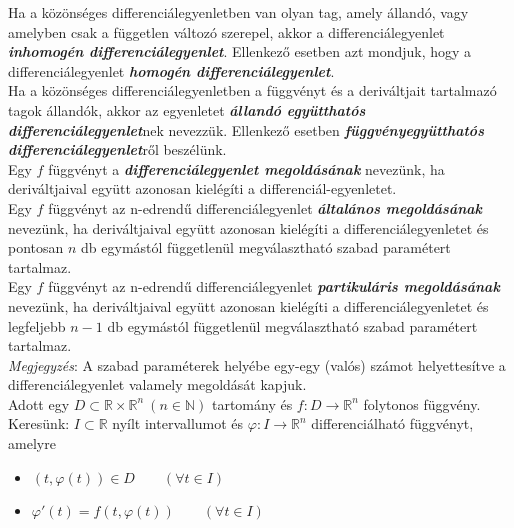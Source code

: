 \documentclass[12pt,margin=0px]{article}
\begin{document}
    \noindent Ha a közönséges differenciálegyenletben van olyan tag, amely állandó, vagy amelyben csak a független változó szerepel, akkor a differenciálegyenlet \textbf{\emph{inhomogén differenciálegyenlet}}. Ellenkező esetben azt mondjuk, hogy a differenciálegyenlet \textbf{\emph{homogén differenciálegyenlet}}.\\

    \noindent Ha a közönséges differenciálegyenletben a függvényt és a deriváltjait tartalmazó tagok állandók, akkor az egyenletet \textbf{\emph{állandó együtthatós differenciálegyenlet}}nek nevezzük.  Ellenkező esetben \textbf{\emph{függvényegyütthatós differenciálegyenlet}}ről beszélünk.\\

    \noindent Egy $f$ függvényt a \textbf{\emph{differenciálegyenlet megoldásának}} nevezünk, ha deriváltjaival együtt azonosan kielégíti a differenciál-egyenletet.\\

    \noindent Egy $f$ függvényt  az n-edrendű  differenciálegyenlet \textbf{\emph{általános megoldásának}} nevezünk, ha deriváltjaival együtt azonosan kielégíti a differenciálegyenletet és pontosan $n$ db egymástól függetlenül megválasztható szabad paramétert tartalmaz.\\

    \noindent Egy $f$ függvényt az n-edrendű differenciálegyenlet \textbf{\emph{partikuláris megoldásának}} nevezünk, ha deriváltjaival együtt azonosan kielégíti a differenciálegyenletet és legfeljebb $n-1$ db egymástól függetlenül megválasztható szabad paramétert tartalmaz.\\

    \noindent \emph{Megjegyzés}: A szabad paraméterek helyébe egy-egy (valós) számot helyettesítve a differenciálegyenlet valamely megoldását kapjuk.\\

    \noindent Adott egy $D \subset \mathbb{R} \times \mathbb{R}^{n}\ (n \in \mathbb{N})$ tartomány és $f:D \to \mathbb{R}^n$ folytonos függvény.\\

    \noindent Keresünk: $I \subset \mathbb{R}$ nyílt intervallumot és $\varphi: I \to \mathbb{R}^n$ differenciálható függvényt, amelyre
    \begin{itemize}
      \item $(t, \varphi(t)) \in D\qquad (\forall t \in I)$
      \item $\varphi'(t) = f(t, \varphi(t))\qquad (\forall t \in I)$
    \end{itemize}
\end{document}
